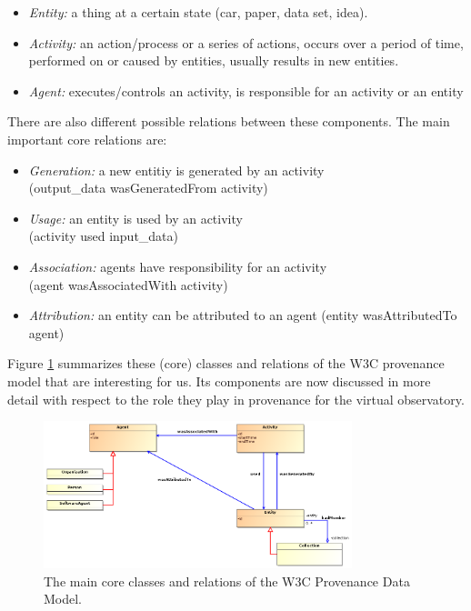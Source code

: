 \documentclass[11pt,a4paper]{ivoa}
\begin{document}
\begin{itemize}

\item \emph{Entity:} a thing at a certain state (car, paper, data set, idea).

\item \emph{Activity:} an action/process or a series of actions, occurs over a period of time, performed on or caused by entities, usually results in new entities.

\item \emph{Agent:} executes/controls an activity, is responsible for an activity or an entity
\end{itemize}

\noindent
There are also different possible relations between these components. The main important core relations are:
\begin{itemize}
\item \emph{Generation:} a new entitiy is generated by an activity\\
		(output\_data wasGeneratedFrom activity)
\item \emph{Usage:} an entity is used by an activity\\
		(activity used input\_data)
\item \emph{Association:} agents have responsibility for an activity\\
 		(agent wasAssociatedWith activity)
\item \emph{Attribution:} an entity can be attributed to an agent (entity wasAttributedTo agent)
\end{itemize}

Figure \ref{fig:w3cclasses} summarizes these (core) classes and relations of the W3C provenance model that are interesting for us.
Its components are now discussed in more detail with respect to the role they play in provenance for the virtual observatory.

\begin{figure}
\centering
\includegraphics[width=0.8\textwidth]{ProvDM-W3C-classdiagram.png}
\caption{The main core classes and relations of the W3C Provenance Data Model.}
\label{fig:w3cclasses}
\end{figure}
\end{document}
